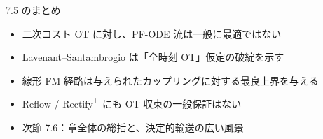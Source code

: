 \asmain
\begin{frame}{7.5 のまとめ}
    \begin{itemize}
        \item 二次コスト OT に対し、PF-ODE 流は一般に最適ではない
        \item Lavenant--Santambrogio は「全時刻 OT」仮定の破綻を示す
        \item 線形 FM 経路は与えられたカップリングに対する最良上界を与える
        \item Reflow / $\mathrm{Rectify}^\perp$ にも OT 収束の一般保証はない
        \item 次節 7.6：章全体の総括と、決定的輸送の広い風景
    \end{itemize}
\end{frame}
